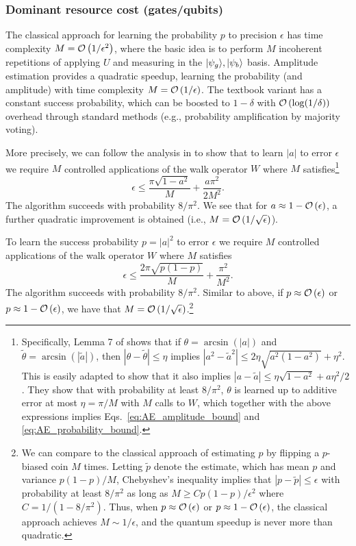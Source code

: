 \begin{refsection}
\subsubsection*{Dominant resource cost (gates/qubits)}
The classical approach for learning the probability $p$ to precision $\epsilon$ has time complexity $M = \mathcal{O}\left( 1/\epsilon^2 \right)$, where the basic idea is to perform $M$ incoherent repetitions of applying $U$ and measuring in the $\lvert\psi_g\rangle, \lvert\psi_b\rangle$ basis. Amplitude estimation provides a quadratic speedup, learning the probability (and amplitude) with time complexity $M = \mathcal{O}\left( 1/\epsilon \right)$. The textbook variant has a constant success probability, which can be boosted to $1-\delta$ with $\mathcal{O}\left( \log(1/\delta) \right)$ overhead through standard methods (e.g., probability amplification by majority voting).

More precisely, we can follow the analysis in \cite{brassard2002AmpAndEst} to show that to learn $|a|$ to error $\epsilon$ we require $M$ controlled applications of the walk operator $W$ where $M$ satisfies\footnote{Specifically, Lemma 7 of \cite{brassard2002AmpAndEst} shows that if $\theta = \arcsin(|a|)$ and $\tilde{\theta} = \arcsin(|\tilde{a}|)$, then $|\theta-\tilde{\theta}|\leq \eta$ implies $|a^2-\tilde{a}^2| \leq 2\eta\sqrt{a^2(1-a^2)}+\eta^2$. This is easily adapted to show that it also implies $|a-\tilde{a}|\leq \eta\sqrt{1-a^2} + a\eta^2/2$. They show that with probability at least $8/\pi^2$, $\theta$ is learned up to additive error at most $\eta = \pi/M$ with $M$ calls to $W$, which together with the above expressions implies Eqs.~\eqref{eq:AE_amplitude_bound} and \eqref{eq:AE_probability_bound}.}
\begin{equation}\label{eq:AE_amplitude_bound}
    \epsilon \leq \frac{\pi \sqrt{1-a^2}}{M} + \frac{a\pi^2}{2M^2}.
\end{equation}
The algorithm succeeds with probability $8/\pi^2$. We see that for $a \approx 1-\mathcal{O}\left( \epsilon \right)$, a further quadratic improvement is obtained (i.e., $M = \mathcal{O}\left(  1/\sqrt{\epsilon} \right)$).

To learn the success probability $p=|a|^2$ to error $\epsilon$ we require $M$ controlled applications of the walk operator $W$ where $M$ satisfies~\cite{brassard2002AmpAndEst}
\begin{equation}\label{eq:AE_probability_bound}
    \epsilon \leq \frac{2\pi \sqrt{p(1-p)}}{M} + \frac{\pi^2}{M^2}.
\end{equation}
The algorithm succeeds with probability $8/\pi^2$. Similar to above, if $p \approx \mathcal{O}\left( \epsilon \right)$ or $p \approx 1-\mathcal{O}\left( \epsilon \right)$, we have that $M = \mathcal{O}\left( 1/\sqrt{\epsilon} \right)$.\footnote{We can compare to the classical approach of estimating $p$ by flipping a $p$-biased coin $M$ times. Letting $\tilde{p}$ denote the estimate, which has mean $p$ and variance $p(1-p)/M$, Chebyshev's inequality implies that $|p-\tilde{p}|\leq \epsilon$ with probability at least $8/\pi^2$ as long as $M \geq C p(1-p)/\epsilon^2$ where $C = 1/(1-8/\pi^2)$.
Thus, when $p \approx \mathcal{O}\left( \epsilon \right)$ or $p\approx 1-\mathcal{O}\left( \epsilon \right)$, the classical approach achieves $M \sim 1/\epsilon$, and the quantum speedup is never more than quadratic. } 


\end{refsection}

